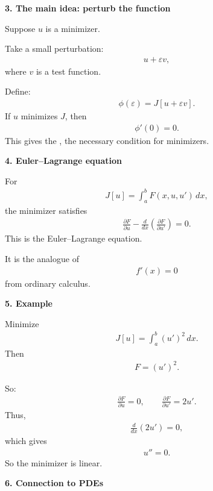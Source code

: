 \documentclass[12pt,a4paper]{report}
\begin{document}
\begin{description}
\item \textbf{3. The main idea: perturb the function}

Suppose $u$ is a minimizer.

Take a small perturbation:
\begin{align*}
u+\varepsilon v,
\end{align*}
where $v$ is a test function.

Define:
\begin{align*}
\phi(\varepsilon)=J[u+\varepsilon v].
\end{align*}
If $u$ minimizes $J$, then
\begin{align*}
\phi'(0)=0.
\end{align*}
This gives the , the necessary condition for minimizers.

\item \textbf{4. Euler–Lagrange equation}

For
\begin{align*}
J[u]=\int_a^b F(x,u,u')\,dx,
\end{align*}
the minimizer satisfies
\begin{align*}
\frac{\partial F}{\partial u} - \frac{d}{dx} \left( \frac{\partial F}{\partial u'} \right) =0.
\end{align*}
This is the Euler–Lagrange equation.

It is the analogue of
\begin{align*}
f'(x)=0
\end{align*}
from ordinary calculus.

\item \textbf{5. Example}

Minimize
\begin{align*}
J[u]=\int_a^b (u')^2\,dx.
\end{align*}
Then
\begin{align*}
F=(u')^2.
\end{align*}

So:
\begin{align*}
\frac{\partial F}{\partial u}=0, \qquad \frac{\partial F}{\partial u'}=2u'.
\end{align*}
Thus,
\begin{align*}
\frac{d}{dx}(2u')=0,
\end{align*}
which gives
\begin{align*}
u''=0.
\end{align*}
So the minimizer is linear.

\item \textbf{6. Connection to PDEs}


\end{description}
\end{document}
